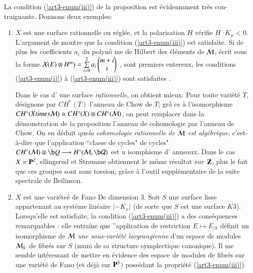 \begin{remarque*}
La condition (\ref{art3-enum(iii)}) de la proposition est \'evidenmment tr\`es con-traignante. Donnons deux exemples:

\begin{enumerate}[{\rm a)}]
\item $X$ est une surface rationnelle ou r\'egl\'ee, et la polarisation $H$ v\'erifie $H$ $\cdot K_{x}<0$. L'argument de \cite[cor. 6.7.3]{art3-keyM} montre que la condition (\ref{art3-enum(iii)}) est satisfaite. Si de plus les coefficients $a_{i}$ du polyn\^o me de Hilbert des \'el\'ements de $\mathcal{M}$, \'ecrit sous la forme\label{art3-enmu(a))}
$
\mathcal{X}(E)\otimes H^{m}) = \sum\limits_{i=0}^{2}a_{i}
\begin{pmatrix}
m+i\\
i
\end{pmatrix}
$
, sont premiers entereux, les conditions (\ref{art3-enum(i)}) \`a (\ref{art3-enum(iii)}) sont satisfaites \cite[$\calx$6]{art3-keyM}.

Dans le cas d' une surface \textit{rationnelle}, on obtient mieux. Pour toute vari\'et\'e $T$, d\'esignons par $C H^{*}(T)$ l'anneau de Chow de $T$; gr\^a ce \`a l'isomorphisme $C H^{*}(X times \mathcal{M}) \cong C H ^{*}(X) \otimes C H^{*}(\mathcal{M})$, on peut remplacer dans la d\'emonstration de la proposition l'anneau de cohomologie par l'anneau de Chow. On en d\'eduit que\textit{la cohomologie rationnelle de $\mathcal{M}$ est alg\'ebrique}, c'est-\`a-dire que l'application ``classe de cycles" de cycles" $C H^{*}(\calM) \otimes \b Q \longrightarrow H^{*}(\cal M , \b Q)$ est u isomphisme d' anneaux. Dans le cas $X= \mathbf{P}^{2}$, ellingsrud et Str\o mme obtiennent le m\^ome r\'esultat $sur$ $\mathbf{Z}$, plus le fait que ces groupes sont sans torsion, gr\^ace \`a l'outil suppl\'ementaire de la suite spectrale de Beilinson. 

\item $X$ est une vari\'ete\'e de Fano De dimension 3. Soit $S$ une surface lisse appartenant au syst\`eme lin\'eaire $|-K_{x}|$ (de sorte que $S$ est une surface $K3$). Lorsqu'elle est satisfaite, la condition (\ref{art3-enum(iii)}) a des cons\'equences remarquables \cite{art3-keyT}: elle entra\^ine que ''application de restriction $E \longmapsto E_{|S}$ d\'efinit un isomorphisme de $\mathcal{M}$ \textit{une sous-vari\'et\'e largrangienne} d'un espace de modules $\mathcal{M}_{S}$ de fibr\'es sur $S$ (muni de sa structure symplectique canonique). Il me semble int\'eressant de mettre en \'evidence des espace de modules de fibr\'es sur une vari\'et\'e de Fano (et d\'ej\`a sur $\mathbf{P}^{3}$) poss\'edant la propri\'et\'e (\ref{art3-enum(iii)}). \label{art3-enmu(b))} 
\end{enumerate}
\end{remarque*}

